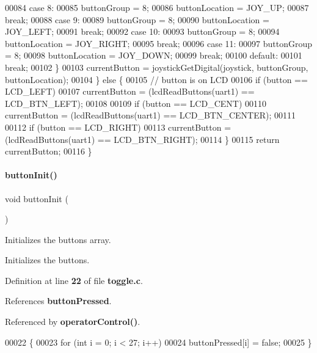 \begin{DoxyCode}
00084     \textcolor{keywordflow}{case} 8:
00085       buttonGroup = 8;
00086       buttonLocation = JOY\_UP;
00087       \textcolor{keywordflow}{break};
00088     \textcolor{keywordflow}{case} 9:
00089       buttonGroup = 8;
00090       buttonLocation = JOY\_LEFT;
00091       \textcolor{keywordflow}{break};
00092     \textcolor{keywordflow}{case} 10:
00093       buttonGroup = 8;
00094       buttonLocation = JOY\_RIGHT;
00095       \textcolor{keywordflow}{break};
00096     \textcolor{keywordflow}{case} 11:
00097       buttonGroup = 8;
00098       buttonLocation = JOY\_DOWN;
00099       \textcolor{keywordflow}{break};
00100     \textcolor{keywordflow}{default}:
00101       \textcolor{keywordflow}{break};
00102     \}
00103     currentButton = joystickGetDigital(joystick, buttonGroup, buttonLocation);
00104   \} \textcolor{keywordflow}{else} \{
00105     \textcolor{comment}{// button is on LCD}
00106     \textcolor{keywordflow}{if} (button == LCD_LEFT)
00107       currentButton = (lcdReadButtons(uart1) == LCD\_BTN\_LEFT);
00108 
00109     \textcolor{keywordflow}{if} (button == LCD_CENT)
00110       currentButton = (lcdReadButtons(uart1) == LCD\_BTN\_CENTER);
00111 
00112     \textcolor{keywordflow}{if} (button == LCD_RIGHT)
00113       currentButton = (lcdReadButtons(uart1) == LCD\_BTN\_RIGHT);
00114   \}
00115   \textcolor{keywordflow}{return} currentButton;
00116 \}
\end{DoxyCode}
\mbox{\label{a00146_a2b3d226371575c894979ab84bce95626}} 
\paragraph{button\+Init()}
{\footnotesize\ttfamily void button\+Init (\begin{DoxyParamCaption}{ }\end{DoxyParamCaption})}



Initializes the buttons array. 

Initializes the buttons. 

Definition at line \textbf{ 22} of file \textbf{ toggle.\+c}.



References \textbf{ button\+Pressed}.



Referenced by \textbf{ operator\+Control()}.


\begin{DoxyCode}
00022                   \{
00023   \textcolor{keywordflow}{for} (\textcolor{keywordtype}{int} i = 0; i < 27; i++)
00024     buttonPressed[i] = \textcolor{keyword}{false};
00025 \}
\end{DoxyCode}
\mbox{\label{a00146_a07c56bf50097f5bf35c5e8c9067800e1}} 
